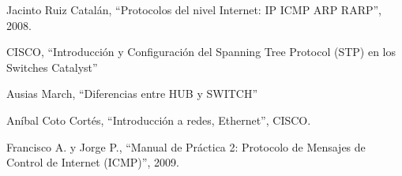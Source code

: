 \documentclass[a4paper,12pt]{article}
\begin{document}
\begin{thebibliography}{1}
 Jacinto Ruiz Catalán, ``Protocolos del nivel Internet: IP ICMP ARP RARP'', 2008.
 
 CISCO, ``Introducción y Configuración del Spanning Tree Protocol (STP) en los Switches Catalyst''
 
 Ausias March, ``Diferencias entre HUB y SWITCH''
 
 Aníbal Coto Cortés, ``Introducción a redes, Ethernet'', CISCO.

 Francisco A. y Jorge P., ``Manual de Práctica 2: Protocolo de Mensajes de Control de Internet (ICMP)'', 2009.
 
\end{thebibliography}
\end{document}
